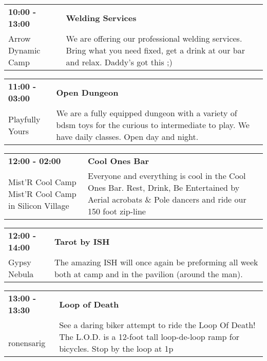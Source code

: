 \begin{tabular}{ p{1in} p{2.2in} }
    \textbf{10:00 - 13:00} & \textbf{Welding Services} \\
    Arrow Dynamic Camp \newline  & We are offering our professional welding services.  Bring what you need fixed, get a drink at our bar and relax. Daddy's got this ;) \\
    \hline 
\end{tabular}
    
\begin{tabular}{ p{1in} p{2.2in} }
    \textbf{11:00 - 03:00} & \textbf{Open Dungeon} \\
    Playfully Yours \newline  & We are a fully equipped dungeon with a variety of bdsm toys for the curious to intermediate to play. We have daily classes. Open day and night. \\
    \hline 
\end{tabular}
    
\begin{tabular}{ p{1in} p{2.2in} }
    \textbf{12:00 - 02:00} & \textbf{Cool Ones Bar } \\
    Mist'R Cool Camp \newline Mist'R Cool Camp in Silicon Village & Everyone and everything is cool in the Cool Ones Bar. Rest, Drink, Be Entertained by Aerial acrobats \& Pole dancers and ride our 150 foot zip-line \\
    \hline 
\end{tabular}
    
\begin{tabular}{ p{1in} p{2.2in} }
    \textbf{12:00 - 14:00} & \textbf{Tarot by ISH} \\
    Gypsy Nebula \newline  & The amazing ISH will once again be preforming all week both at camp and in the pavilion (around the man). \\
    \hline 
\end{tabular}
    
\begin{tabular}{ p{1in} p{2.2in} }
    \textbf{13:00 - 13:30} & \textbf{Loop of Death} \\
    ~ \newline ronensarig & See a daring biker attempt to ride the Loop Of Death! The L.O.D. is a 12-foot tall loop-de-loop ramp for bicycles. Stop by the loop at 1p \\
    \hline 
\end{tabular}
    
